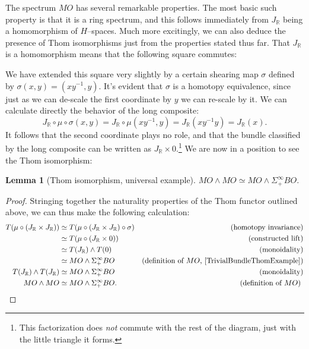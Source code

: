 \documentclass{article}
\renewcommand{\S}{\mathbb S}
\newcommand{\R}{\mathbb R}
\newcommand{\<}{\langle}
\renewcommand{\>}{\rangle}
\newcommand{\sm}{\wedge}
\newcommand{\Susp}{\Sigma}
\newcommand{\GL}{\mathit{GL}}
\numberwithin{equation}{section}
\theoremstyle{plain}
\newtheorem{lemma}[equation]{Lemma}
\theoremstyle{definition}
\theoremstyle{remark}
\begin{document}
The spectrum $MO$ has several remarkable properties.  The most basic such property is that it is a ring spectrum, and this follows immediately from $J_{\R}$ being a homomorphism of $H$--spaces.  Much more excitingly, we can also deduce the presence of Thom isomorphisms just from the properties stated thus far.  That $J_{\R}$ is a homomorphism means that the following square commutes:
\begin{center}
\end{center}
We have extended this square very slightly by a certain shearing map $\sigma$ defined by $\sigma(x, y) = (xy^{-1}, y)$.  It's evident that $\sigma$ is a homotopy equivalence, since just as we can de-scale the first coordinate by $y$ we can re-scale by it.  We can calculate directly the behavior of the long composite: \[J_{\R} \circ \mu \circ \sigma(x, y) = J_{\R} \circ \mu(xy^{-1}, y) = J_{\R}(xy^{-1}y) = J_{\R}(x).\]  It follows that the second coordinate plays no role, and that the bundle classified by the long composite can be written as $J_{\R} \times 0$.\footnote{This factorization does \emph{not} commute with the rest of the diagram, just with the little triangle it forms.}  We are now in a position to see the Thom isomorphism:
\begin{lemma}[Thom isomorphism, universal example] $MO \sm MO \simeq MO \sm \Susp^\infty_+ BO$.
\end{lemma}
\begin{proof}
Stringing together the naturality properties of the Thom functor outlined above, we can thus make the following calculation:
\begin{align*}
T(\mu \circ (J_{\R} \times J_{\R})) & \simeq T(\mu \circ (J_{\R} \times J_{\R}) \circ \sigma) & \text{(homotopy invariance)} \\
& \simeq T(\mu \circ (J_{\R} \times 0)) & \text{(constructed lift)} \\
& \simeq T(J_{\R}) \sm T(0) & \text{(monoidality)} \\
& \simeq MO \sm \Susp^\infty_+ BO & \text{(definition of $MO$, \Cref{TrivialBundleThomExample})} \\
T(J_{\R}) \sm T(J_{\R}) & \simeq MO \sm \Susp^\infty_+ BO & \text{(monoidality)} \\
MO \sm MO & \simeq MO \sm \Susp^\infty_+ BO. & \text{(definition of $MO$) \qedhere}
\end{align*}
\end{proof}
\end{document}
